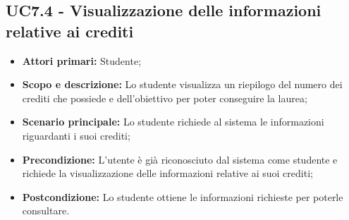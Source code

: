 \documentclass[AnalisiDeiRequisiti.tex]{subfiles}
\begin{document}
\subsection{UC7.4 - Visualizzazione delle informazioni relative ai crediti}
\begin{itemize}
	\item \textbf{Attori primari:} Studente;\\
	\item \textbf{Scopo e descrizione:} Lo studente visualizza un riepilogo del numero dei crediti che possiede e dell'obiettivo per poter conseguire la laurea;\\
	\item \textbf{Scenario principale:} Lo studente richiede al sistema le informazioni riguardanti i suoi crediti;\\
	\item \textbf{Precondizione:} L'utente è già riconosciuto dal sistema come studente e richiede la visualizzazione delle informazioni relative ai suoi crediti;\\
	\item \textbf{Postcondizione:} Lo studente ottiene le informazioni richieste per poterle consultare.\\
\end{itemize}
\end{document}

